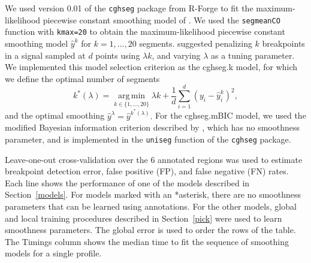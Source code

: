 \documentclass{bioinfo}
\newcommand{\argmin}{\operatorname*{arg\, min}}
\newcommand{\model}[1]{#1}
\newcommand{\code}[1]{\texttt{#1}}
\newcommand{\package}[1]{\texttt{#1}}
\begin{document}
\begin{methods}
We used version 0.01 of the \package{cghseg} package from
R-Forge to fit the maximum-likelihood piecewise constant smoothing
model of \cite{cghseg}. We used the \code{segmeanCO} function with
\code{kmax=20} to obtain the maximum-likelihood piecewise constant
smoothing model $\hat y^k$ for $k= 1, \dots, 20$ segments.
\cite{lavielle2005} suggested penalizing $k$ breakpoints in a signal
sampled at $d$ points using $\lambda k$, and varying $\lambda$ as a
tuning parameter. We implemented this model selection criterion as the
\model{cghseg.k} model, for which we define the optimal number of segments 
\begin{equation}
  \label{eq:cghseg.k}
  k^*(\lambda) = 
\argmin_{k\in\{1,\dots,20\}}
\lambda k+  \frac 1 d \sum_{i=1}^d (y_i-\hat y_i^k)^2,
\end{equation}
and the optimal smoothing $
  \hat y^\lambda = \hat y^{k^*(\lambda)}.
$
For the \model{cghseg.mBIC} model, we used the
modified Bayesian information criterion described by \cite{mBIC},
which has no smoothness parameter, and is implemented in the
\code{uniseg} function of the \package{cghseg}
package. 



\end{methods}


\begin{table*}[hb!]
\begin{center}

\end{center}
\caption{
  \label{table-generalization-error-global-models}
  Leave-one-out cross-validation 
  over the 6 annotated regions
  was used to estimate 
  breakpoint detection error,
  false positive (FP), and false negative (FN) rates.
  Each line shows the performance of one of the models 
  described in Section~\ref{models}.
  For models marked with an *asterisk,
  there are no smoothness parameters that can be learned using annotations.
  For the other models, global and local training procedures described in 
  Section~\ref{pick} were used to 
  learn smoothness parameters.
  The global error
  is used to order the rows of the table.
  The Timings column shows the median time to fit the 
  sequence of smoothing models for a single profile.
}
\end{table*}
\end{document}
